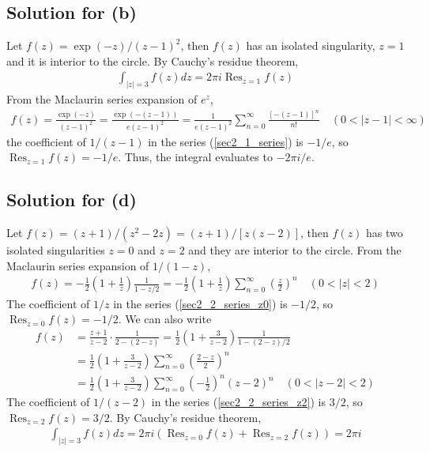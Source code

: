 \documentclass{scrartcl}
\DeclareMathOperator*{\Res}{Res}
\begin{document}
\subsection{Solution for (b)}
Let \(f(z) = \exp(-z) / (z - 1)^2\), then \(f(z)\) has an isolated singularity, \(z = 1\) and it is interior to the circle.
By Cauchy's residue theorem,
\begin{align*}
  \int_{|z| = 3} f(z) dz = 2\pi i \Res_{z = 1} f(z)
\end{align*}
From the Maclaurin series expansion of \(e^z\),
\begin{align}\label{sec2_1_series}
  f(z)
  = \frac{\exp(-z)}{(z - 1)^2}
  = \frac{\exp(-(z - 1))}{e(z - 1)^2}
  = \frac{1}{e(z - 1)^2} \sum^\infty_{n = 0} \frac{[-(z - 1)]^n}{n!} \quad (0 < |z - 1| < \infty)
\end{align}
the coefficient of \(1 / (z - 1)\) in the series (\ref{sec2_1_series}) is \(-1 / e\), so \(\Res_{z = 1} f(z) = -1 / e\).
Thus, the integral evaluates to \(-2\pi i / e\).

\subsection{Solution for (d)}
Let \(f(z) = (z + 1) / (z^2 - 2z) = (z + 1) / [z(z - 2)]\), then \(f(z)\) has two isolated singularities \(z = 0\) and \(z = 2\) and they are interior to the circle.
From the Maclaurin series expansion of \(1 / (1 - z)\),
\begin{align}\label{sec2_2_series_z0}
  f(z)
  = -\frac{1}{2} \left( 1 + \frac{1}{z} \right) \frac{1}{1 - z / 2}
  = -\frac{1}{2} \left( 1 + \frac{1}{z} \right) \sum^\infty_{n = 0} \left( \frac{z}{2} \right)^n \quad (0 < |z| < 2)
\end{align}
The coefficient of \(1 / z\) in the series (\ref{sec2_2_series_z0}) is \(-1 / 2\), so \(\Res_{z = 0} f(z) = -1 / 2\).
We can also write
\begin{align}
  \nonumber f(z)
  \nonumber &= \frac{z + 1}{z - 2} \cdot \frac{1}{2 - (2 - z)}
  \nonumber = \frac{1}{2} \left( 1 + \frac{3}{z - 2} \right) \frac{1}{1 - (2 - z) / 2} \\
  \nonumber &= \frac{1}{2} \left( 1 + \frac{3}{z - 2} \right) \sum^\infty_{n = 0} \left( \frac{2 - z}{2} \right)^n \\
  \label{sec2_2_series_z2} &= \frac{1}{2} \left( 1 + \frac{3}{z - 2} \right) \sum^\infty_{n = 0} \left( -\frac{1}{2} \right)^n (z - 2)^n \quad (0 < |z - 2| < 2)
\end{align}
The coefficient of \(1 / (z - 2)\) in the series (\ref{sec2_2_series_z2}) is \(3 / 2\), so \(\Res_{z = 2} f(z) = 3 / 2\).
By Cauchy's residue theorem,
\begin{align*}
  \int_{|z| = 3} f(z) dz = 2\pi i \left( \Res_{z = 0} f(z) + \Res_{z = 2} f(z) \right) = 2\pi i
\end{align*}
\end{document}
